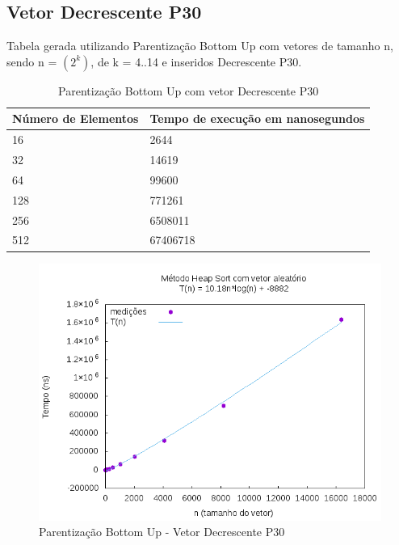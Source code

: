 \documentclass[12pt,a4paper,twoside]{report}
\begin{document}
\subsection{Vetor Decrescente P30}
Tabela gerada utilizando Parentização Bottom Up com vetores de tamanho n, sendo n = $(2^k)$, de k = 4..14 e inseridos Decrescente P30.
\begin{table}[H]
\centering
\caption{Parentização Bottom Up com vetor Decrescente P30}
\label{my-label}
\begin{tabular}{|l|l|}
\hline
\multicolumn{1}{|c|}{\textbf{Número de Elementos}} & \multicolumn{1}{c|}{\textbf{Tempo de execução em nanosegundos}} \\ \hline
16 & 2644 \\ \hline
32 & 14619 \\ \hline
64 & 99600 \\ \hline
128 & 771261 \\ \hline
256 & 6508011 \\ \hline
512 & 67406718 \\ \hline
\end{tabular}
\end{table}

\begin{figure}[H]
    \centering
    \includegraphics[width=0.7\linewidth]{graficos/HeapSort/vIntAleatorio/vIntAleatorio.png}
  \caption{Parentização Bottom Up - Vetor Decrescente P30}
\end{figure}
\end{document}
